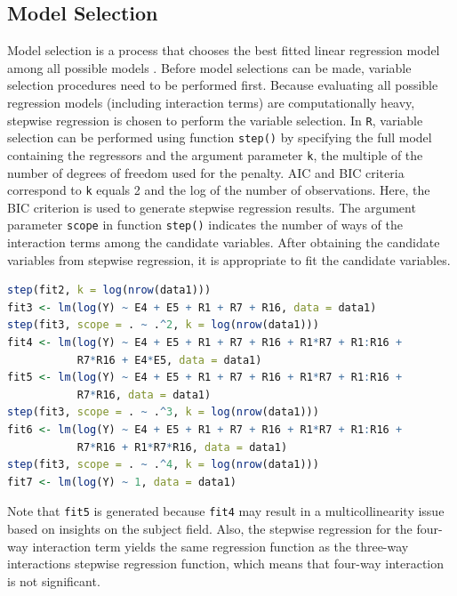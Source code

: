 \documentclass[11pt]{article}
\begin{document}
\subsection{Model Selection}
Model selection is a process that chooses the best fitted linear regression model among all possible models \cite{bk:kutner, bk:montgomery}. Before model selections can be made, variable selection procedures need to be performed first. Because evaluating all possible regression models (including interaction terms) are computationally heavy, stepwise regression is chosen to perform the variable selection. In \texttt{R}, variable selection can be performed using function \texttt{step()} by specifying the full model containing the regressors and the argument parameter \texttt{k}, the multiple of the number of degrees of freedom used for the penalty. AIC and BIC criteria correspond to \texttt{k} equals 2 and the log of the number of observations. Here, the BIC criterion is used to generate stepwise regression results. The argument parameter \texttt{scope} in function \texttt{step()} indicates the number of ways of the interaction terms among the candidate variables. After obtaining the candidate variables from stepwise regression, it is appropriate to fit the candidate variables.

\begin{file}[project.r]
\begin{lstlisting}[language = R]
step(fit2, k = log(nrow(data1)))
fit3 <- lm(log(Y) ~ E4 + E5 + R1 + R7 + R16, data = data1)
step(fit3, scope = . ~ .^2, k = log(nrow(data1)))
fit4 <- lm(log(Y) ~ E4 + E5 + R1 + R7 + R16 + R1*R7 + R1:R16 + 
           R7*R16 + E4*E5, data = data1)
fit5 <- lm(log(Y) ~ E4 + E5 + R1 + R7 + R16 + R1*R7 + R1:R16 + 
           R7*R16, data = data1)
step(fit3, scope = . ~ .^3, k = log(nrow(data1)))
fit6 <- lm(log(Y) ~ E4 + E5 + R1 + R7 + R16 + R1*R7 + R1:R16 + 
           R7*R16 + R1*R7*R16, data = data1)
step(fit3, scope = . ~ .^4, k = log(nrow(data1)))
fit7 <- lm(log(Y) ~ 1, data = data1)
\end{lstlisting}
\end{file}

Note that \texttt{fit5} is generated because \texttt{fit4} may result in a multicollinearity issue based on insights on the subject field. Also, the stepwise regression for the four-way interaction term yields the same regression function as the three-way interactions stepwise regression function, which means that four-way interaction is not significant. 
\end{document}
